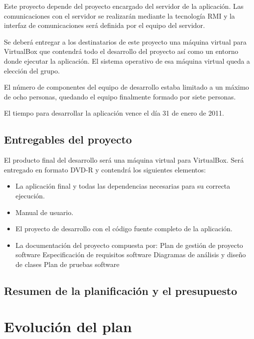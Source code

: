 Este proyecto depende del proyecto encargado del servidor de la aplicación. Las
comunicaciones con el servidor se realizarán mediante la tecnología RMI y la
interfaz de comunicaciones será definida por el equipo del servidor.

Se deberá entregar a los destinatarios de este proyecto una máquina virtual
para VirtualBox que contendrá todo el desarrollo del proyecto así como un
entorno donde ejecutar la aplicación. El sistema operativo de esa máquina
virtual queda a elección del grupo.

El número de componentes del equipo de desarrollo estaba limitado a un máximo
de ocho personas, quedando el equipo finalmente formado por siete personas.

El tiempo para desarrollar la aplicación vence el día 31 de enero de 2011.

\subsection{Entregables del proyecto}

El producto final del desarrollo será una máquina virtual para VirtualBox. Será
entregado en formato DVD-R y contendrá los siguientes elementos:
\begin{itemize}
\item La aplicación final y todas las dependencias necesarias para su correcta
ejecución.
\item Manual de usuario.
\item El proyecto de desarrollo con el código fuente completo de la aplicación.
\item La documentación del proyecto compuesta por:
\subitem Plan de gestión de proyecto software
\subitem Especificación de requisitos software
\subitem Diagramas de análisis y diseño de clases
\subitem Plan de pruebas software
\end{itemize}

\subsection{Resumen de la planificación y el presupuesto}

\section{Evolución del plan}
